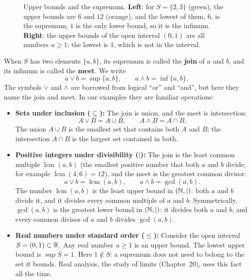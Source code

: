 \begin{figure}[htbp]
\caption{Upper bounds and the supremum. \textbf{Left}: for $S = \{2, 3\}$ (green), the upper bounds are $6$ and $12$ (orange), and the lowest of them, $6$, is the supremum; $1$ is the only lower bound, so it is the infimum. \textbf{Right}: the upper bounds of the open interval $(0, 1)$ are all numbers $u \ge 1$; the lowest is $1$, which is not in the interval.}
\label{16:fig-bounds}
\end{figure}

When $S$ has two elements $\{a, b\}$, its supremum is called the \textbf{join} of $a$ and $b$, and its infimum is called the \textbf{meet}. We write
\[
a \lor b = \sup\{a, b\}, \qquad a \land b = \inf\{a, b\}.
\]
The symbols $\lor$ and $\land$ are borrowed from logical ``or'' and ``and'', but here they name the join and meet. In our examples they are familiar operations:
\begin{itemize}
\item \textbf{Sets under inclusion ($\subseteq$):} The join is union, and the meet is intersection:
\[
A \lor B = A \cup B, \qquad A \land B = A \cap B.
\]
The union $A \cup B$ is the smallest set that contains both $A$ and $B$; the intersection $A \cap B$ is the largest set contained in both.
\item \textbf{Positive integers under divisibility ($\mid$):} The join is the least common multiple $\operatorname{lcm}(a, b)$ (the smallest positive number that both $a$ and $b$ divide; for example $\operatorname{lcm}(4, 6) = 12$), and the meet is the greatest common divisor:
\[
a \lor b = \operatorname{lcm}(a, b), \qquad a \land b = \gcd(a, b).
\]
The number $\operatorname{lcm}(a, b)$ is the least upper bound in $(\mathbb{N}, \mid)$: both $a$ and $b$ divide it, and it divides every common multiple of $a$ and $b$. Symmetrically, $\gcd(a, b)$ is the greatest lower bound in $(\mathbb{N}, \mid)$: it divides both $a$ and $b$, and every common divisor of $a$ and $b$ divides $\gcd(a, b)$.
\item \textbf{Real numbers under standard order ($\le$):} Consider the open interval $S = (0, 1) \subset \mathbb{R}$. Any real number $u \ge 1$ is an upper bound. The lowest upper bound is $\sup S = 1$. Here $1 \notin S$: a supremum does not need to belong to the set it bounds. Real analysis, the study of limits (Chapter~20), uses this fact all the time.
\end{itemize}

